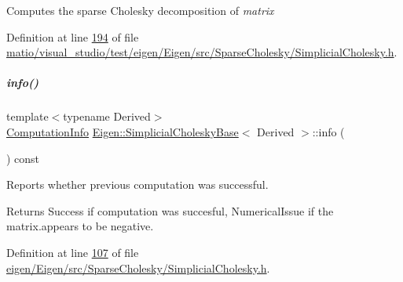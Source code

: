 Computes the sparse Cholesky decomposition of {\itshape matrix} 

Definition at line \hyperlink{matio_2visual__studio_2test_2eigen_2_eigen_2src_2_sparse_cholesky_2_simplicial_cholesky_8h_source_l00194}{194} of file \hyperlink{matio_2visual__studio_2test_2eigen_2_eigen_2src_2_sparse_cholesky_2_simplicial_cholesky_8h_source}{matio/visual\+\_\+studio/test/eigen/\+Eigen/src/\+Sparse\+Cholesky/\+Simplicial\+Cholesky.\+h}.

\mbox{\label{group___sparse_cholesky___module_a3ac877f73aaaff670e6ae7554eb02fc8}} 
\subparagraph{\texorpdfstring{info()}{info()}\hspace{0.1cm}{\footnotesize\ttfamily [1/2]}}
{\footnotesize\ttfamily template$<$typename Derived$>$ \\
\hyperlink{group__enums_ga85fad7b87587764e5cf6b513a9e0ee5e}{Computation\+Info} \hyperlink{group___sparse_cholesky___module_class_eigen_1_1_simplicial_cholesky_base}{Eigen\+::\+Simplicial\+Cholesky\+Base}$<$ Derived $>$\+::info (\begin{DoxyParamCaption}{ }\end{DoxyParamCaption}) const\hspace{0.3cm}{\ttfamily [inline]}}



Reports whether previous computation was successful. 

\begin{DoxyReturn}{Returns}
{\ttfamily Success} if computation was succesful, {\ttfamily Numerical\+Issue} if the matrix.\+appears to be negative. 
\end{DoxyReturn}


Definition at line \hyperlink{eigen_2_eigen_2src_2_sparse_cholesky_2_simplicial_cholesky_8h_source_l00107}{107} of file \hyperlink{eigen_2_eigen_2src_2_sparse_cholesky_2_simplicial_cholesky_8h_source}{eigen/\+Eigen/src/\+Sparse\+Cholesky/\+Simplicial\+Cholesky.\+h}.

